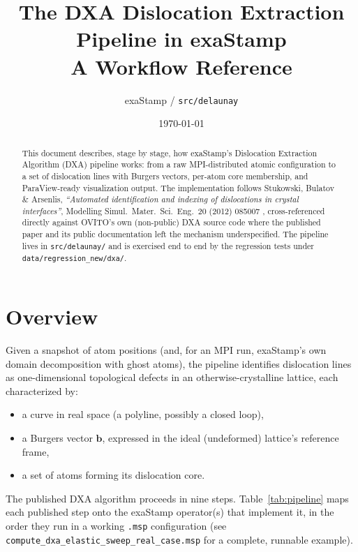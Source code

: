 \documentclass[11pt,a4paper]{article}
\title{The DXA Dislocation Extraction Pipeline in exaStamp\\
\large A Workflow Reference}
\author{exaStamp / \texttt{src/delaunay}}
\date{\today}
\newcommand{\vb}[1]{\boldsymbol{#1}}
\begin{document}
\maketitle

\begin{abstract}
This document describes, stage by stage, how exaStamp's Dislocation Extraction Algorithm (DXA)
pipeline works: from a raw MPI-distributed atomic configuration to a set of dislocation lines with
Burgers vectors, per-atom core membership, and ParaView-ready visualization output. The
implementation follows Stukowski, Bulatov \& Arsenlis, \emph{``Automated identification and
indexing of dislocations in crystal interfaces''}, Modelling Simul.\ Mater.\ Sci.\ Eng.\ 20 (2012)
085007 \cite{stukowski2012}, cross-referenced directly against OVITO's own (non-public) DXA source
code where the published paper and its public documentation left the mechanism underspecified. The
pipeline lives in \texttt{src/delaunay/} and is exercised end to end by the regression tests under
\texttt{data/regression\_new/dxa/}.
\end{abstract}

\tableofcontents

\section{Overview}

Given a snapshot of atom positions (and, for an MPI run, exaStamp's own domain decomposition with
ghost atoms), the pipeline identifies dislocation lines as one-dimensional topological defects in
an otherwise-crystalline lattice, each characterized by:
\begin{itemize}[nosep]
  \item a curve in real space (a polyline, possibly a closed loop),
  \item a Burgers vector $\vb{b}$, expressed in the ideal (undeformed) lattice's reference frame,
  \item a set of atoms forming its dislocation core.
\end{itemize}

The published DXA algorithm proceeds in nine steps. Table~\ref{tab:pipeline} maps each published
step onto the exaStamp operator(s) that implement it, in the order they run in a working
\texttt{.msp} configuration (see \texttt{compute\_dxa\_elastic\_sweep\_real\_case.msp} for a
complete, runnable example).
\end{document}
